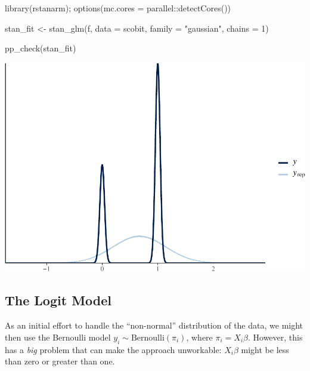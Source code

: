 \documentclass[
]{book}
\newenvironment{Shaded}{\begin{snugshade}}{\end{snugshade}}
\newcommand{\AttributeTok}[1]{\textcolor[rgb]{0.77,0.63,0.00}{#1}}
\newcommand{\DecValTok}[1]{\textcolor[rgb]{0.00,0.00,0.81}{#1}}
\newcommand{\FunctionTok}[1]{\textcolor[rgb]{0.00,0.00,0.00}{#1}}
\newcommand{\NormalTok}[1]{#1}
\newcommand{\OtherTok}[1]{\textcolor[rgb]{0.56,0.35,0.01}{#1}}
\newcommand{\SpecialCharTok}[1]{\textcolor[rgb]{0.00,0.00,0.00}{#1}}
\newcommand{\StringTok}[1]{\textcolor[rgb]{0.31,0.60,0.02}{#1}}
\begin{document}
\begin{Shaded}
\begin{Highlighting}[]
\FunctionTok{library}\NormalTok{(rstanarm); }\FunctionTok{options}\NormalTok{(}\AttributeTok{mc.cores =}\NormalTok{ parallel}\SpecialCharTok{::}\FunctionTok{detectCores}\NormalTok{())}

\NormalTok{stan\_fit }\OtherTok{\textless{}{-}} \FunctionTok{stan\_glm}\NormalTok{(f, }\AttributeTok{data =}\NormalTok{ scobit, }\AttributeTok{family =} \StringTok{"gaussian"}\NormalTok{, }\AttributeTok{chains =} \DecValTok{1}\NormalTok{)}
\end{Highlighting}
\end{Shaded}

\begin{Shaded}
\begin{Highlighting}[]
\FunctionTok{pp\_check}\NormalTok{(stan\_fit)}
\end{Highlighting}
\end{Shaded}

\includegraphics{03-02-bernoulli-model_files/figure-latex/unnamed-chunk-4-1.pdf}

\hypertarget{the-logit-model}{%
\subsection{The Logit Model}\label{the-logit-model}}

As an initial effort to handle the ``non-normal'' distribution of the
data, we might then use the Bernoulli model
\(y_i \sim \text{Bernoulli}(\pi_i)\), where \(\pi_i = X_i\beta\).
However, this has a \emph{big} problem that can make the approach
unworkable: \(X_i\beta\) might be less than zero or greater than one.
\end{document}
